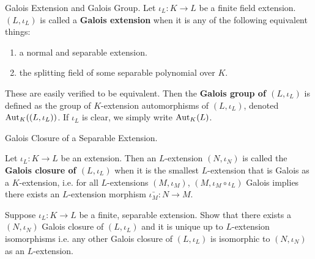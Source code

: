 \documentclass[../book.tex]{subfiles}
\begin{document}
\begin{dfn} Galois Extension and Galois Group.
    Let $\iota_L : K \to L$ be a finite field extension. 
    $(L,\iota_L)$ is called a \textbf{Galois extension} when 
    it is any of the following equivalent things: 
    \begin{enumerate}
        \item a normal and separable extension.
        \item the splitting field of some separable polynomial over $K$. 
    \end{enumerate} 
    These are easily verified to be equivalent. 
    Then the \textbf{Galois group of $(L,\iota_L)$} is defined as 
    the group of $K$-extension automorphisms of $(L,\iota_L)$, 
    denoted $\text{Aut}_{K}((L,\iota_L))$.
    If $\iota_L$ is clear, we simply write $\text{Aut}_{K}(L)$. 
\end{dfn}

\begin{ex} Galois Closure of a Separable Extension.
    
    Let $\iota_L : K \to L$ be an extension.
    Then an $L$-extension $(N,\iota_N)$ is called 
    the \textbf{Galois closure of $(L,\iota_L)$} 
    when it is the smallest $L$-extension that is Galois as a $K$-extension,
    i.e. for all $L$-extensions $(M,\iota_M)$,
    $(M,\iota_M\circ\iota_L)$ Galois implies
    there exists an $L$-extension morphism $\bar{\iota_M} : N \to M$. 
    
    Suppose $\iota_L : K \to L$ be a finite, separable extension. 
    Show that there exists a $(N,\iota_N)$ Galois closure of $(L,\iota_L)$
    and it is unique up to $L$-extension isomorphisms i.e.
    any other Galois closure of $(L,\iota_L)$ is isomorphic to $(N,\iota_N)$
    as an $L$-extension. 
    
\end{ex}
\end{document}

